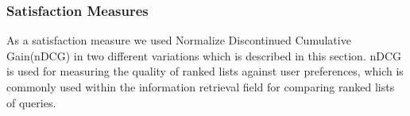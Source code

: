 \subsubsection{Satisfaction Measures}\label{sec:satisfactionmeasures}
As a satisfaction measure we used Normalize Discontinued Cumulative Gain(nDCG) in two different variations which is described in this section. nDCG is used for measuring the quality of ranked lists against user preferences, which is commonly used within the information retrieval field for comparing ranked lists of queries\cite{ndcg}.


